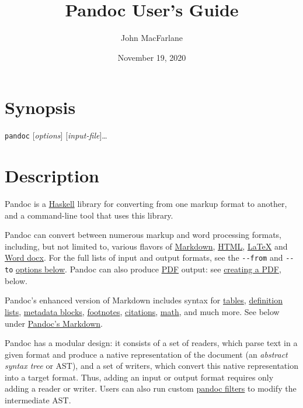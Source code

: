 \documentclass[]{article}
\title{Pandoc User's Guide}
\author{John MacFarlane}
\date{November 19, 2020}
\begin{document}
\maketitle

\hypertarget{synopsis}{%
\section{Synopsis}\label{synopsis}}

\texttt{pandoc} {[}\emph{options}{]} {[}\emph{input-file}{]}\ldots{}

\hypertarget{description}{%
\section{Description}\label{description}}

Pandoc is a \href{https://www.haskell.org}{Haskell} library for
converting from one markup format to another, and a command-line tool
that uses this library.

Pandoc can convert between numerous markup and word processing formats,
including, but not limited to, various flavors of
\href{https://daringfireball.net/projects/markdown/}{Markdown},
\href{https://www.w3.org/html/}{HTML},
\href{https://www.latex-project.org/}{LaTeX} and
\href{https://en.wikipedia.org/wiki/Office_Open_XML}{Word docx}. For the
full lists of input and output formats, see the \texttt{-\/-from} and
\texttt{-\/-to} \protect\hyperlink{general-options}{options below}.
Pandoc can also produce \href{https://www.adobe.com/pdf/}{PDF} output:
see \protect\hyperlink{creating-a-pdf}{creating a PDF}, below.

Pandoc's enhanced version of Markdown includes syntax for
\protect\hyperlink{tables}{tables},
\protect\hyperlink{definition-lists}{definition lists},
\protect\hyperlink{metadata-blocks}{metadata blocks},
\protect\hyperlink{footnotes}{footnotes},
\protect\hyperlink{citations}{citations},
\protect\hyperlink{math}{math}, and much more. See below under
\protect\hyperlink{pandocs-markdown}{Pandoc's Markdown}.

Pandoc has a modular design: it consists of a set of readers, which
parse text in a given format and produce a native representation of the
document (an \emph{abstract syntax tree} or AST), and a set of writers,
which convert this native representation into a target format. Thus,
adding an input or output format requires only adding a reader or
writer. Users can also run custom
\href{https://pandoc.org/filters.html}{pandoc filters} to modify the
intermediate AST.
\end{document}
